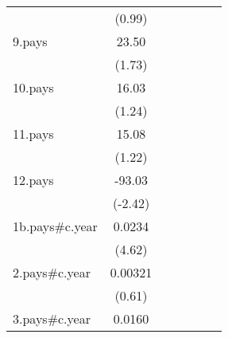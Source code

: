 {\begin{tabular}{l*{6}{c}}
                    &      (0.99)         &                     &                     &                     &                     &                     \\
[1em]
9.pays              &       23.50         &                     &                     &                     &                     &                     \\
                    &      (1.73)         &                     &                     &                     &                     &                     \\
[1em]
10.pays             &       16.03         &                     &                     &                     &                     &                     \\
                    &      (1.24)         &                     &                     &                     &                     &                     \\
[1em]
11.pays             &       15.08         &                     &                     &                     &                     &                     \\
                    &      (1.22)         &                     &                     &                     &                     &                     \\
[1em]
12.pays             &      -93.03\sym{*}  &                     &                     &                     &                     &                     \\
                    &     (-2.42)         &                     &                     &                     &                     &                     \\
[1em]
1b.pays#c.year      &      0.0234\sym{***}&                     &                     &                     &                     &                     \\
                    &      (4.62)         &                     &                     &                     &                     &                     \\
[1em]
2.pays#c.year       &     0.00321         &                     &                     &                     &                     &                     \\
                    &      (0.61)         &                     &                     &                     &                     &                     \\
[1em]
3.pays#c.year       &      0.0160\sym{**} &                     &                     &                     &                     &                     \\

\end{tabular}}
